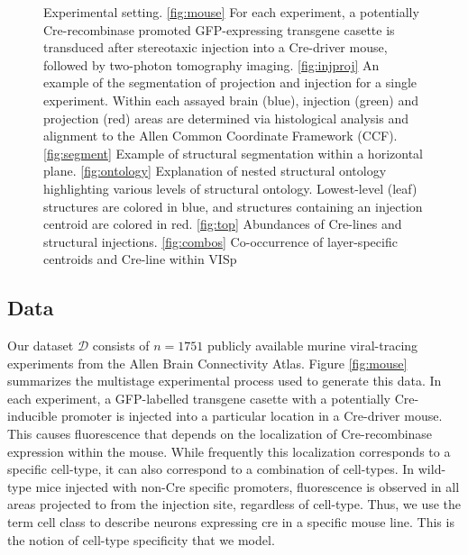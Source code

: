 \begin{figure}[H]
    \caption{Experimental setting.  \ref{fig:mouse}  For each experiment, a potentially Cre-recombinase promoted GFP-expressing transgene casette is transduced after stereotaxic injection into a Cre-driver mouse, followed by two-photon tomography imaging. \ref{fig:injproj} An example of the segmentation of projection and injection for a single experiment. Within each assayed brain (blue), injection (green) and projection (red) areas are determined via histological analysis and alignment to the Allen Common Coordinate Framework (CCF).   \ref{fig:segment} Example of structural segmentation within a horizontal plane. \ref{fig:ontology} Explanation of nested structural ontology highlighting various levels of structural ontology.  Lowest-level (leaf) structures are colored in blue, and structures containing an injection centroid are colored in red. \ref{fig:top}  Abundances of Cre-lines and structural injections. \ref{fig:combos}  Co-occurrence of layer-specific centroids and Cre-line within VISp}
    \label{fig:data}
\end{figure}

\newpage

\subsection{Data}

Our dataset $\mathcal D$ consists of $n=1751$ publicly available murine viral-tracing experiments from the Allen Brain Connectivity Atlas.
Figure \ref{fig:mouse} summarizes the multistage experimental process used to generate this data.
In each experiment, a GFP-labelled transgene casette with a potentially Cre-inducible promoter is injected into a particular location in a Cre-driver mouse.
This causes fluorescence that depends on the localization of Cre-recombinase expression within the mouse.
While frequently this localization corresponds to a specific cell-type, it can also correspond to a combination of cell-types.
In wild-type mice injected with non-Cre specific promoters, fluorescence is observed in all areas projected to from the injection site, regardless of cell-type.
Thus, we use the term cell class to describe neurons expressing cre in a specific mouse line.
This is the notion of cell-type specificity that we model.

